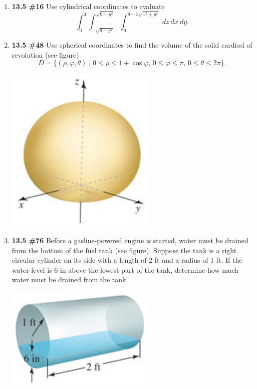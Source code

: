 \documentclass[%
]{article}
\begin{document}
\begin{enumerate}
\item {\bf 13.5 \#16}
Use cylindrical coordinates to evaluate
\[
\int_0^3\int_{-\sqrt{9-y^2}}^{\sqrt{9-y^2}}\int_0^{9-3\sqrt{x^2+y^2}}\ dz\ dx\ dy.
\]

\newpage
\item {\bf 13.5 \#48}
Use spherical coordinates to find the volume of the solid cardiod of revolution (see figure)
\[
D=\{(\rho,\varphi,\theta)\mid 0\leq\rho\leq 1+\cos{\varphi},\, 0\leq\varphi\leq\pi,\, 0\leq \theta\leq 2\pi\}.
\]

\begin{center}
\includegraphics[scale=0.75]{Q6cardiod}
\end{center}

\item {\bf 13.5 \#76}
Before a gasline-powered engine is started, water must be drained from the bottom of the fuel tank (see figure).  Suppose the tank is a right circular cylinder on its side with a length of 2 ft and a radius of 1 ft.  If the water level is 6 in above the lowest part of the tank, determine how much water must be drained from the tank.

\begin{center}
\includegraphics[scale=1]{Q6tank}
\end{center}

\end{enumerate}
\end{document}
